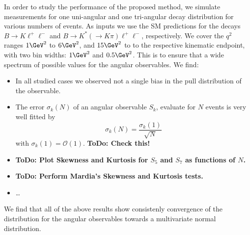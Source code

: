 \documentclass[aps,prd,reprint,nofootinbib,preprintnumbers]{revtex4}
\newcommand{\order}[1]{\mathcal{O}\left({#1}\right)}
\newcommand{\todo}[1]{{\color{red}\bf ToDo: #1}}
\begin{document}
In order to study the performance of the proposed method, we simulate measurements for one uni-angular
and one tri-angular decay distribution for various numbers of events. As inputs we use the SM predictions
for the decays $B\to K\ell^+\ell^-$ and $B\to K^*(\to K\pi)\ell^+\ell^-$, respectively. We cover the
$q^2$ ranges $1\GeV^2$ to $6\GeV^2$, and $15\GeV^2$ to to the respective kinematic endpoint, with two
bin widths: $1\GeV^2$ and $0.5\GeV^2$. This is to ensure that a wide spectrum of possible values for
the angular observables. We find:
\begin{itemize}
    \item In all studied cases we observed not a single bias in the pull distribution of the observable.
    \item The error $\sigma_k(N)$ of an angular observable $S_k$, evaluate for $N$ events is very well
        fitted by
        \begin{equation}
            \sigma_k(N) = \frac{\sigma_k(1)}{\sqrt{N}}
        \end{equation}
        with $\sigma_k(1) = \order{1}$. \todo{Check this!}
    \item \todo{Plot Skewness and Kurtosis for $S_5$ and $S_7$ as functions of $N$.}
    \item \todo{Perform Mardia's Skewness and Kurtosis tests.}
    \item \dots
\end{itemize}
We find that all of the above results show consistenly convergence of the distribution for the angular observables
towards a multivariate normal distribution.
\end{document}
